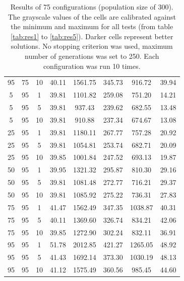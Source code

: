 \begin{table}[H]
\begin{tabular}{ccc|c|c|c|c|c}
95 & 75 & 10 & \cellcolor{gray!48}40.11 & \cellcolor{gray!1}1561.75 & \cellcolor{gray!1}345.73 & \cellcolor{gray!1}916.72 & 39.94\\
5 & 95 & 1 & \cellcolor{gray!50}39.81 & \cellcolor{gray!1}1101.82 & \cellcolor{gray!1}259.08 & \cellcolor{gray!22}751.20 & 14.21\\
5 & 95 & 5 & \cellcolor{gray!50}39.81 & \cellcolor{gray!15}937.43 & \cellcolor{gray!1}239.62 & \cellcolor{gray!44}682.55 & 13.48\\
5 & 95 & 10 & \cellcolor{gray!50}39.81 & \cellcolor{gray!20}910.88 & \cellcolor{gray!1}237.34 & \cellcolor{gray!46}674.67 & 13.08\\
25 & 95 & 1 & \cellcolor{gray!50}39.81 & \cellcolor{gray!1}1180.11 & \cellcolor{gray!1}267.77 & \cellcolor{gray!21}757.28 & 20.92\\
25 & 95 & 5 & \cellcolor{gray!50}39.81 & \cellcolor{gray!1}1054.81 & \cellcolor{gray!1}253.74 & \cellcolor{gray!43}682.71 & 20.09\\
25 & 95 & 10 & \cellcolor{gray!50}39.85 & \cellcolor{gray!4}1001.84 & \cellcolor{gray!1}247.52 & \cellcolor{gray!40}693.13 & 19.87\\
50 & 95 & 1 & \cellcolor{gray!49}39.95 & \cellcolor{gray!1}1321.32 & \cellcolor{gray!1}295.87 & \cellcolor{gray!4}810.30 & 29.16\\
50 & 95 & 5 & \cellcolor{gray!50}39.81 & \cellcolor{gray!1}1081.48 & \cellcolor{gray!1}272.77 & \cellcolor{gray!33}716.21 & 29.37\\
50 & 95 & 10 & \cellcolor{gray!50}39.81 & \cellcolor{gray!1}1085.92 & \cellcolor{gray!1}275.22 & \cellcolor{gray!27}736.31 & 27.83\\
75 & 95 & 1 & \cellcolor{gray!34}41.47 & \cellcolor{gray!1}1562.49 & \cellcolor{gray!1}347.35 & \cellcolor{gray!1}1038.87 & 40.31\\
75 & 95 & 5 & \cellcolor{gray!48}40.11 & \cellcolor{gray!1}1369.60 & \cellcolor{gray!1}326.74 & \cellcolor{gray!1}834.21 & 42.06\\
75 & 95 & 10 & \cellcolor{gray!50}39.85 & \cellcolor{gray!1}1272.90 & \cellcolor{gray!1}302.24 & \cellcolor{gray!1}832.11 & 36.91\\
95 & 95 & 1 & \cellcolor{gray!1}51.78 & \cellcolor{gray!1}2012.85 & \cellcolor{gray!1}421.27 & \cellcolor{gray!1}1265.05 & 48.92\\
95 & 95 & 5 & \cellcolor{gray!34}41.43 & \cellcolor{gray!1}1692.14 & \cellcolor{gray!1}373.30 & \cellcolor{gray!1}1030.19 & 48.13\\
95 & 95 & 10 & \cellcolor{gray!37}41.12 & \cellcolor{gray!1}1575.49 & \cellcolor{gray!1}360.56 & \cellcolor{gray!1}985.45 & 44.60
\end{tabular}
\caption{Results of 75 configurations (population size of 300). The grayscale values of the cells are calibrated against the minimum and maximum for all tests (from table \ref{tab:res1} to \ref{tab:res5}). Darker cells represent better solutions. No stopping criterion was used, maximum number of generations was set to 250. Each configuration was run 10 times.}
\label{tab:res2}
\end{table}


